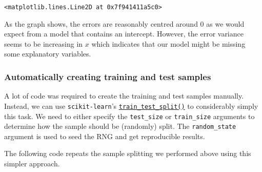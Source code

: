 \documentclass{scrartcl}
\makeatletter
\newcommand{\boxspacing}{\kern\kvtcb@left@rule\kern\kvtcb@boxsep}
\newcommand{\prompt}[4]{
        {\ttfamily\llap{{\color{#2}[#3]:\hspace{3pt}#4}}\vspace{-\baselineskip}}
    }
\makeatother
\begin{document}
            \begin{tcolorbox}[breakable, size=fbox, boxrule=.5pt, pad at break*=1mm, opacityfill=0]
\prompt{Out}{outcolor}{11}{\boxspacing}
\begin{Verbatim}[commandchars=\\\{\}]
<matplotlib.lines.Line2D at 0x7f941411a5c0>
\end{Verbatim}
\end{tcolorbox}
        
    \begin{center}
    \end{center}
    
    As the graph shows, the errors are reasonably centred around \(0\) as we
would expect from a model that contains an intercept. However, the error
variance seems to be increasing in \(x\) which indicates that our model
might be missing some explanatory variables.

    \hypertarget{automatically-creating-training-and-test-samples}{%
\subsubsection*{Automatically creating training and test
samples}\label{automatically-creating-training-and-test-samples}}

A lot of code was required to create the training and test samples
manually. Instead, we can use \texttt{scikit-learn}'s
\href{https://scikit-learn.org/stable/modules/generated/sklearn.model_selection.train_test_split.html}{\texttt{train\_test\_split()}}
to considerably simply this task. We need to either specify the
\texttt{test\_size} or \texttt{train\_size} arguments to determine how
the sample should be (randomly) split. The \texttt{random\_state}
argument is used to seed the RNG and get reproducible results.

The following code repeats the sample splitting we performed above using
this simpler approach.
\end{document}
